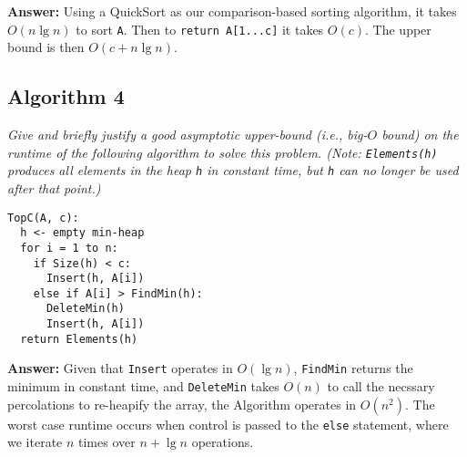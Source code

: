 \documentclass[11pt, oneside]{article}   	%
\theoremstyle{definition}
\theoremstyle{remark}
\begin{document}
\textbf{Answer: } Using a QuickSort as our comparison-based sorting algorithm, it takes $O(n \lg n)$ to sort \texttt{A}. Then to \texttt{return A[1...c]} it takes $O(c)$. The upper bound is then $O(c+n \lg n)$.  


\subsection{Algorithm 4}
\textit{Give and briefly justify a good asymptotic upper-bound (i.e., big-$O$
bound) on the runtime of the following algorithm to solve this problem. (Note: \texttt{Elements(h)} produces all elements in the heap \texttt{h} in
constant time, but \texttt{h} can no longer be used after that point.)}
\begin{verbatim}
TopC(A, c):
  h <- empty min-heap
  for i = 1 to n:
    if Size(h) < c:
      Insert(h, A[i])
    else if A[i] > FindMin(h):
      DeleteMin(h)
      Insert(h, A[i])
  return Elements(h)
\end{verbatim}

\textbf{Answer: }Given that \texttt{Insert} operates in $O(\lg n)$, \texttt{FindMin} returns the minimum in constant time, and \texttt{DeleteMin} takes $O(n)$ to call the necssary percolations to re-heapify the array, the Algorithm operates in $O(n^2)$. The worst case runtime occurs when control is passed to the \texttt{else} statement, where we iterate $n$ times over $n+\lg n$ operations. 
\end{document}
